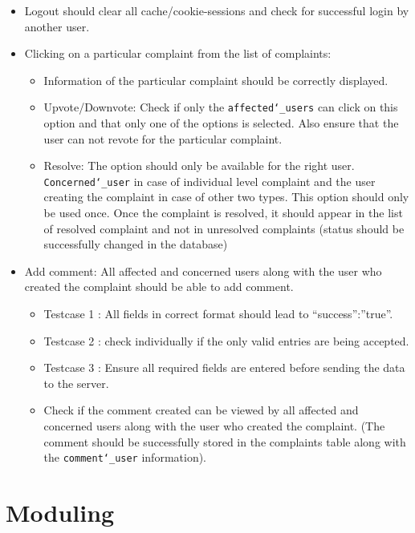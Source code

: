 \documentclass[a4paper]{article}
\begin{document}
\begin{enumerate}
\begin{itemize}
\begin{itemize}
\end{itemize}
\item Logout should clear all cache/cookie-sessions and check for successful login by another user.
\item Clicking on a particular complaint from the list of complaints:
\begin{itemize}
\renewcommand\labelitemi{--}
\item Information of the particular complaint should be correctly displayed.
\item Upvote/Downvote:
Check if only the \texttt{affected\char`_users} can click on this option and that only one of the options is selected. Also ensure that the user can not revote for the particular complaint.
\item Resolve:
The option should only be available for the right user.
\texttt{Concerned\char`_user} in case of individual level complaint and the user creating the complaint in case of other two types.
This option should only be used once.
Once the complaint is resolved, it should appear in the list of resolved complaint and not in unresolved complaints (status should be successfully changed in the database)
\end{itemize}
\item Add comment:
All affected and concerned users along with the user who created the complaint should be able to add comment.
\begin{itemize}
\renewcommand\labelitemi{--}
\item Testcase 1 : All fields in correct format should lead to “success”:”true”.
\item Testcase 2 : check individually if the only valid entries are being accepted.
\item Testcase 3 : Ensure all required fields are entered before sending the data to the server.
\item Check if the comment created can be viewed by all affected and concerned users along with the user who created the complaint. (The comment should be successfully stored in the complaints table along with the \texttt{comment\char`_user} information).
\end{itemize}

\end{itemize}
\end{enumerate}

\section{Moduling}
\end{document}
